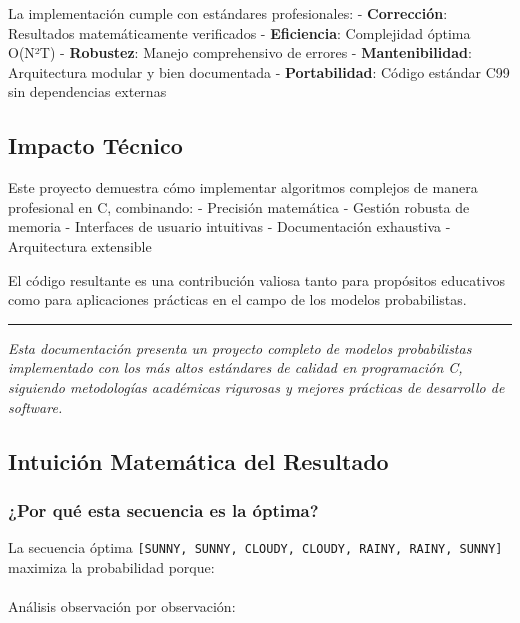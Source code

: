 \documentclass[
]{article}
\makeatletter
\let\oldparagraph\paragraph
\renewcommand{\paragraph}{
    \@ifstar
      \xxxParagraphStar
      \xxxParagraphNoStar
  }
\newcommand{\xxxParagraphStar}[1]{\oldparagraph*{#1}\mbox{}}
\newcommand{\xxxParagraphNoStar}[1]{\oldparagraph{#1}\mbox{}}
\makeatother
\begin{document}
La implementación cumple con estándares profesionales: -
\textbf{Corrección}: Resultados matemáticamente verificados -
\textbf{Eficiencia}: Complejidad óptima O(N²T) - \textbf{Robustez}:
Manejo comprehensivo de errores - \textbf{Mantenibilidad}: Arquitectura
modular y bien documentada - \textbf{Portabilidad}: Código estándar C99
sin dependencias externas

\subsection{Impacto Técnico}\label{impacto-tuxe9cnico}

Este proyecto demuestra cómo implementar algoritmos complejos de manera
profesional en C, combinando: - Precisión matemática - Gestión robusta
de memoria - Interfaces de usuario intuitivas - Documentación exhaustiva
- Arquitectura extensible

El código resultante es una contribución valiosa tanto para propósitos
educativos como para aplicaciones prácticas en el campo de los modelos
probabilistas.

\begin{center}\rule{0.5\linewidth}{0.5pt}\end{center}

\emph{Esta documentación presenta un proyecto completo de modelos
probabilistas implementado con los más altos estándares de calidad en
programación C, siguiendo metodologías académicas rigurosas y mejores
prácticas de desarrollo de software.}

\subsection{Intuición Matemática del
Resultado}\label{intuiciuxf3n-matemuxe1tica-del-resultado}

\subsubsection{¿Por qué esta secuencia es la
óptima?}\label{por-quuxe9-esta-secuencia-es-la-uxf3ptima}

La secuencia óptima
\texttt{{[}SUNNY,\ SUNNY,\ CLOUDY,\ CLOUDY,\ RAINY,\ RAINY,\ SUNNY{]}}
maximiza la probabilidad porque:

\paragraph{Análisis observación por
observación:}\label{anuxe1lisis-observaciuxf3n-por-observaciuxf3n}
\end{document}
